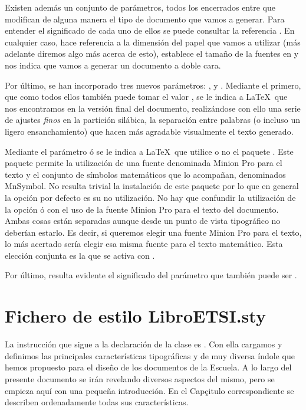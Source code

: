Existen además un conjunto de parámetros, todos los encerrados entre \ttcolor{[...]} que modifican de alguna manera el tipo de documento que vamos a generar. Para entender el significado de cada uno de ellos se puede consultar la referencia \cite{koma}. En cualquier caso,  hace referencia a la dimensión del papel que vamos a utilizar (más adelante diremos algo más acerca de esto), \ttcolor{10pt} establece el tamaño de la fuentes en  y  nos indica que vamos a generar un documento a doble cara. 

Por último, se han incorporado tres nuevos parámetros: ,  y . Mediante el primero, que como todos ellos también puede tomar el valor , se le indica a \LaTeX\ que nos encontramos en la versión final del documento, realizándose con ello una serie de ajustes \emph{finos} en la partición silábica, la separación entre palabras (o incluso un ligero ensanchamiento) que hacen más agradable visualmente el texto generado. 

Mediante el parámetro  ó  se le indica a  \LaTeX\ que utilice o no el paquete . Este paquete permite la utilización de una fuente denominada Minion Pro para el texto y el conjunto de símbolos matemáticos que lo acompañan, denominados MnSymbol. No resulta trivial la instalación de este paquete por lo que en general la opción por defecto es su no utilización. No hay que confundir la utilización de la opción  ó  con el uso de la fuente Minion Pro para el texto del documento. Ambas cosas están separadas aunque desde un punto de vista tipográfico no deberían estarlo. Es decir, si queremos elegir una fuente Minion Pro para el texto, lo más acertado sería elegir esa misma fuente para el texto matemático. Esta elección conjunta es la que se activa con .

Por último, resulta evidente el significado  del parámetro  que también puede ser .

\section{Fichero de estilo LibroETSI.sty}
La instrucción que sigue a la declaración de la clase es  . Con ella  cargamos y definimos  las principales características tipográficas y de muy diversa índole que hemos propuesto para el diseño de los documentos de la Escuela. A lo largo del presente documento se irán revelando diversos aspectos del mismo, pero se empieza aquí con una pequeña introducción. En el Capçitulo correspondiente se describen ordenadamente todas sus características. 

